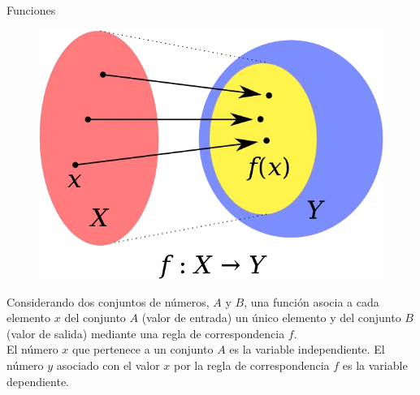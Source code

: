 \begin{infocard}{Funciones}
    \begin{minipage}{0.3\textwidth}
        \begin{figure}[H]
            \centering
            \includegraphics[width=0.6\linewidth]{../images/Rango-de-una-funcion}
            \caption{}
            \label{fig:funciones}
        \end{figure}
    \end{minipage}\hfill
    \begin{minipage}{0.65\textwidth}
        Considerando dos conjuntos de números, $A$ y $B$, una función asocia a cada elemento
        $x$ del conjunto $A$ (valor de entrada) un único elemento y del conjunto $B$ (valor de
        salida) mediante una regla de correspondencia $f$.\\

        El número $x$ que pertenece a un conjunto $A$ es la variable independiente. El número
        $y$ asociado con el valor $x$ por la regla de correspondencia $f$ es la variable
        dependiente.
    \end{minipage}
\end{infocard}